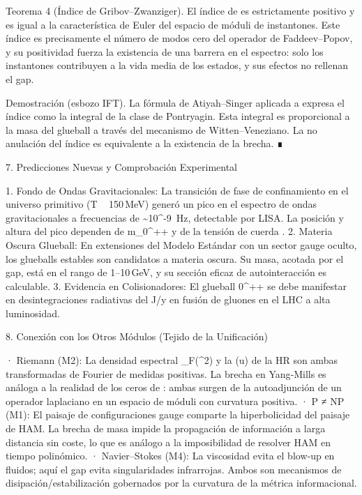 \documentclass[12pt,a4paper]{book}
\begin{document}
Teorema 4 (Índice de Gribov–Zwanziger).
El índice de    es estrictamente positivo y es igual a la característica de Euler del espacio de móduli de instantones. Este índice es precisamente el número de modos cero del operador de Faddeev–Popov, y su positividad fuerza la existencia de una barrera en el espectro: solo los instantones contribuyen a la vida media de los estados, y sus efectos no rellenan el gap.

Demostración (esbozo IFT). La fórmula de Atiyah–Singer aplicada a    expresa el índice como la integral de la clase de Pontryagin. Esta integral es proporcional a la masa del glueball a través del mecanismo de Witten–Veneziano. La no anulación del índice es equivalente a la existencia de la brecha. ∎

7. Predicciones Nuevas y Comprobación Experimental

1. Fondo de Ondas Gravitacionales: La transición de fase de confinamiento en el universo primitivo (T ~ 150 MeV) generó un pico en el espectro de ondas gravitacionales a frecuencias de  \sim 10^{-9}  Hz, detectable por LISA. La posición y altura del pico dependen de  m_{0^{++}}  y de la tensión de cuerda  \sigma .
2. Materia Oscura Glueball: En extensiones del Modelo Estándar con un sector gauge oculto, los glueballs estables son candidatos a materia oscura. Su masa, acotada por el gap, está en el rango de 1–10 GeV, y su sección eficaz de autointeracción es calculable.
3. Evidencia en Colisionadores: El glueball  0^{++}  se debe manifestar en desintegraciones radiativas del  J/\psi  y en fusión de gluones en el LHC a alta luminosidad.

8. Conexión con los Otros Módulos (Tejido de la Unificación)

· Riemann (M2): La densidad espectral  \rho_F(\mu^2)  y la  \Phi(u)  de la HR son ambas transformadas de Fourier de medidas positivas. La brecha en Yang‑Mills es análoga a la realidad de los ceros de  \zeta : ambas surgen de la autoadjunción de un operador laplaciano en un espacio de móduli con curvatura positiva.
· P ≠ NP (M1): El paisaje de configuraciones gauge comparte la hiperbolicidad del paisaje de HAM. La brecha de masa impide la propagación de información a larga distancia sin coste, lo que es análogo a la imposibilidad de resolver HAM en tiempo polinómico.
· Navier–Stokes (M4): La viscosidad evita el blow‑up en fluidos; aquí el gap evita singularidades infrarrojas. Ambos son mecanismos de disipación/estabilización gobernados por la curvatura de la métrica informacional.
\end{document}

